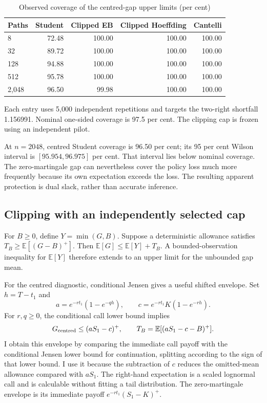 \documentclass[11pt]{article}
\newcommand{\E}{\mathbb E}
\begin{document}
\begin{table}[!htbp]
\centering\small
\caption{Observed coverage of the centred-gap upper limits (per cent)}\label{tab:revision-coverage}
\begin{tabular}{@{}lrrrr@{}}
\toprule
Paths & Student & Clipped EB & Clipped Hoeffding & Cantelli \\
\midrule
8 & 72.48 & 100.00 & 100.00 & 100.00 \\
32 & 89.72 & 100.00 & 100.00 & 100.00 \\
128 & 94.88 & 100.00 & 100.00 & 100.00 \\
512 & 95.78 & 100.00 & 100.00 & 100.00 \\
2,048 & 96.50 & 99.98 & 100.00 & 100.00 \\
\bottomrule
\end{tabular}
\par\smallskip\begin{minipage}{\textwidth}\footnotesize Each entry uses 5,000 independent repetitions and targets the two-right shortfall 1.156991. Nominal one-sided coverage is 97.5 per cent. The clipping cap is frozen using an independent pilot.\end{minipage}
\end{table}

At $n=2048$, centred Student coverage is 96.50 per cent; its 95 per cent Wilson interval is $[95.954,96.975]$ per cent. That interval lies below nominal coverage. The zero-martingale gap can nevertheless cover the policy loss much more frequently because its own expectation exceeds the loss. The resulting apparent protection is dual slack, rather than accurate inference.

\subsection{Clipping with an independently selected cap}

For $B\geq0$, define $Y=\min(G,B)$. Suppose a deterministic allowance satisfies $T_B\geq\E[(G-B)^+]$. Then $\E[G]\leq\E[Y]+T_B$. A bounded-observation inequality for $\E[Y]$ therefore extends to an upper limit for the unbounded gap mean.

For the centred diagnostic, conditional Jensen gives a useful shifted envelope. Set $h=T-t_1$ and
\begin{equation}
 a=e^{-rt_1}(1-e^{-qh}),\qquad
 c=e^{-rt_1}K(1-e^{-rh}).
\end{equation}
For $r,q\geq0$, the conditional call lower bound implies
\begin{equation}
 G_{\rm centred}\leq(aS_1-c)^+,
 \qquad T_B=\E[(aS_1-c-B)^+].
\label{eq:tail}
\end{equation}
I obtain this envelope by comparing the immediate call payoff with the conditional Jensen lower bound for continuation, splitting according to the sign of that lower bound. I use it because the subtraction of $c$ reduces the omitted-mean allowance compared with $aS_1$. The right-hand expectation is a scaled lognormal call and is calculable without fitting a tail distribution. The zero-martingale envelope is its immediate payoff $e^{-rt_1}(S_1-K)^+$.
\end{document}
